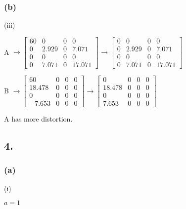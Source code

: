 \documentclass{article}
\begin{document}
\subsubsection*{(b)}
(iii)\par
A $ \rightarrow \begin{bmatrix}
60 & 0 & 0 & 0 \\
0    &2.929        & 0   & 7.071 \\
0 & 0 & 0 & 0 \\
0   & 7.071     &    0  & 17.071 
\end{bmatrix}\rightarrow \begin{bmatrix}
0 & 0 & 0 & 0 \\
0    &2.929        & 0   & 7.071 \\
0 & 0 & 0 & 0 \\
0   & 7.071     &    0  & 17.071 
\end{bmatrix}$\par
B $ \rightarrow \begin{bmatrix}
60 & 0 & 0 & 0 \\
18.478 & 0 & 0 & 0 \\
0 & 0 & 0 & 0 \\
-7.653 & 0 & 0 & 0 
\end{bmatrix}\rightarrow \begin{bmatrix}
0 & 0 & 0 & 0 \\
18.478 & 0 & 0 & 0 \\
0 & 0 & 0 & 0 \\
7.653 & 0 & 0 & 0 
\end{bmatrix}$\par\indent
\par
A has more distortion.


\subsection*{4.}
\subsubsection*{(a)}
(i)\par
$a=1$
\end{document}
